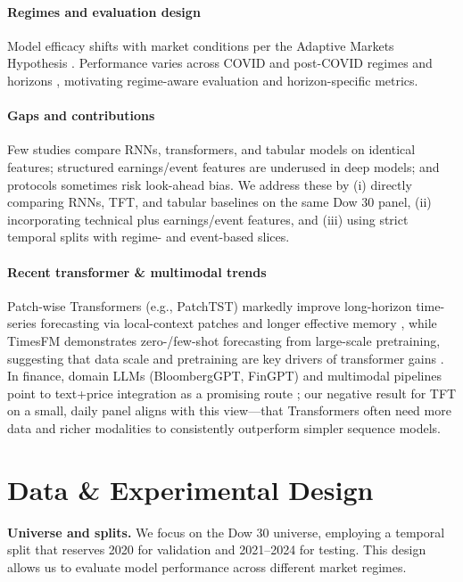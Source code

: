 \documentclass[conference,a4paper]{IEEEtran}
\begin{document}
\paragraph{Regimes and evaluation design} Model efficacy shifts with market conditions per the Adaptive Markets Hypothesis \citep{lo2004}. Performance varies across COVID and post-COVID regimes and horizons \citep{zhang2023review}, motivating regime-aware evaluation and horizon-specific metrics.

\paragraph{Gaps and contributions} Few studies compare RNNs, transformers, and tabular models on identical features; structured earnings/event features are underused in deep models; and protocols sometimes risk look-ahead bias. We address these by (i) directly comparing RNNs, TFT, and tabular baselines on the same Dow 30 panel, (ii) incorporating technical plus earnings/event features, and (iii) using strict temporal splits with regime- and event-based slices.

\paragraph{Recent transformer \& multimodal trends} Patch-wise Transformers (e.g., PatchTST) markedly improve long-horizon time-series forecasting via local-context patches and longer effective memory \citep{nie2023patchtst}, while TimesFM demonstrates zero-/few-shot forecasting from large-scale pretraining, suggesting that data scale and pretraining are key drivers of transformer gains \citep{sen2024timesfm}. In finance, domain LLMs (BloombergGPT, FinGPT) and multimodal pipelines point to text+price integration as a promising route \citep{wu2023bloomberggpt,yang2023fingpt}; our negative result for TFT on a small, daily panel aligns with this view---that Transformers often need more data and richer modalities to consistently outperform simpler sequence models.



\section{Data \& Experimental Design}
	\textbf{Universe and splits.} We focus on the Dow 30 universe, employing a temporal split that reserves 2020 for validation and 2021--2024 for testing. This design allows us to evaluate model performance across different market regimes.
\end{document}
